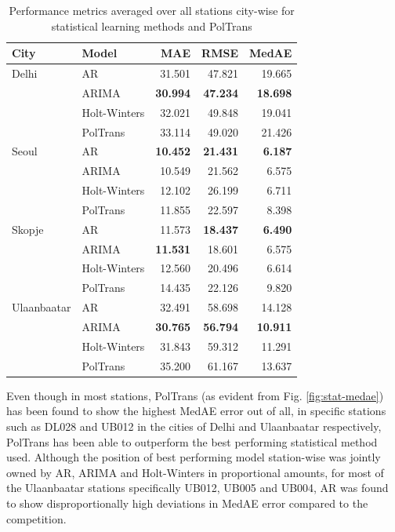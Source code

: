 \documentclass[twocolumn]{svjour3}          %
\begin{document}
\begin{table}[h]
\small
\centering
\tabcolsep=0.16cm
\caption{Performance metrics averaged over all stations city-wise for statistical learning methods and PolTrans}
\label{tbl:stat-performance}
\begin{tabular}{llrrr}
\toprule
City & Model & MAE & RMSE & MedAE \\
\midrule
Delhi & AR & 31.501 & 47.821 & 19.665 \\
& ARIMA & \textbf{30.994} & \textbf{47.234} & \textbf{18.698} \\
& Holt-Winters & 32.021 & 49.848 & 19.041 \\
& PolTrans & 33.114 & 49.020 & 21.426 \\
Seoul & AR & \textbf{10.452} & \textbf{21.431} & \textbf{6.187} \\
& ARIMA & 10.549 & 21.562 & 6.575 \\
& Holt-Winters & 12.102 & 26.199 & 6.711 \\
& PolTrans & 11.855 & 22.597 & 8.398 \\
Skopje & AR & 11.573 & \textbf{18.437} & \textbf{6.490} \\
& ARIMA & \textbf{11.531} & 18.601 & 6.575 \\
& Holt-Winters & 12.560 & 20.496 & 6.614 \\
& PolTrans & 14.435 & 22.126 & 9.820 \\
Ulaanbaatar & AR & 32.491 & 58.698 & 14.128 \\
& ARIMA & \textbf{30.765} & \textbf{56.794} & \textbf{10.911} \\
& Holt-Winters & 31.843 & 59.312 & 11.291 \\
& PolTrans & 35.200 & 61.167 & 13.637 \\
\bottomrule
\end{tabular}
\end{table}

Even though in most stations, {PolTrans} (as evident from Fig. \ref{fig:stat-medae}) has been found to show the highest MedAE error out of all, in specific stations such as DL028 and UB012 in the cities of Delhi and Ulaanbaatar respectively, {PolTrans} has been able to outperform the best performing statistical method used. Although the position of best performing model station-wise was jointly owned by AR, ARIMA and Holt-Winters in proportional amounts, for most of the Ulaanbaatar stations specifically UB012, UB005 and UB004, AR was found to show disproportionally high deviations in MedAE error compared to the competition.
\end{document}
